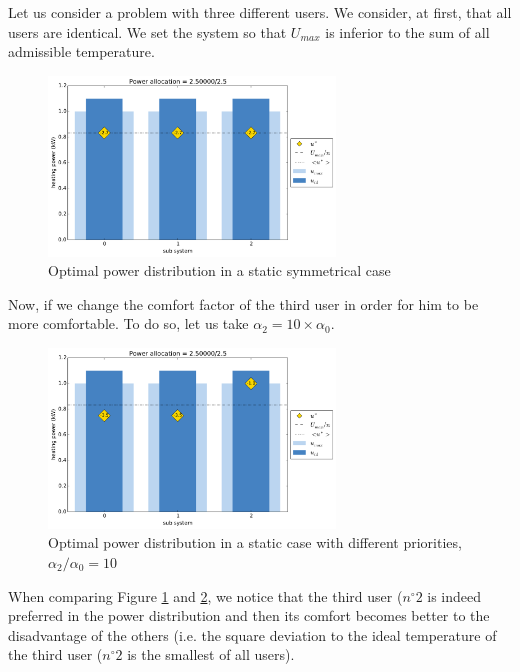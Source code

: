 \documentclass[conference]{IEEEtran}
\begin{document}
Let us consider a problem with three different users. We consider, at first, that all users are identical. We set the system so that $U_{max}$ is inferior to the sum of all admissible temperature. 
\begin{figure}[H]
\centering
\includegraphics[width=3in]{static_PB_init.pdf}
\caption{Optimal power distribution in a static symmetrical case}
\label{statPBinit}
\end{figure}

Now, if we change the comfort factor of the third user in order for him to be more comfortable. To do so, let us take $\alpha_2 = 10\times  \alpha_0 $.

\begin{figure}[H]
\centering
\includegraphics[width=3in]{static_PB_cht.pdf}
\caption{Optimal power distribution in a static case with different priorities, $\alpha_2 / \alpha_0 = 10$ }
\label{statPBcom}
\end{figure}

When comparing Figure \ref{statPBinit} and \ref{statPBcom}, we notice that the third user ($n^{\circ}2$ is indeed preferred in the power distribution and then its comfort becomes better to the disadvantage of the others (i.e. the square deviation to the ideal temperature of the third user ($n^{\circ}2$ is the smallest of all users).
\end{document}
